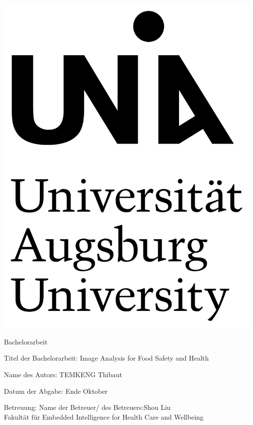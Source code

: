 \documentclass[12pt,a4paper]{scrartcl}
\numberwithin{equation}{section}
\begin{document}
  \pagestyle{empty}

  \begin{titlepage}

    \includegraphics[scale=0.05]{logo_uni} 
    \vspace*{2cm} 

 \begin{center} \large 
    
    Bachelorarbeit
    \vspace*{2cm}

    {\huge Titel der Bachelorarbeit: Image Analysis for Food Safety and Health}
    \vspace*{2.5cm}

    Name des Autors: TEMKENG Thibaut
    \vspace*{1.5cm}

    Datum der Abgabe: Ende Oktober
    \vspace*{4.5cm}


    Betreuung: Name der Betreuer/ des Betreuers:Shou Liu \\[1cm]
    Fakultät für Embedded Intelligence for Health Care and Wellbeing \\[1cm]
  \end{center}
\end{titlepage}
\end{document}
